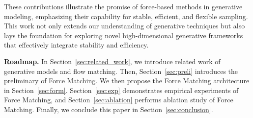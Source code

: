 These contributions illustrate the promise of force-based methods in generative modeling, emphasizing their capability for stable, efficient, and flexible sampling. This work not only extends our understanding of generative techniques but also lays the foundation for exploring novel high-dimensional generative frameworks that effectively integrate stability and efficiency.


{\bf Roadmap.} In Section~\ref{sec:related_work}, we introduce related work of generative models and flow matching. Then, Section~\ref{sec:preli} introduces the preliminary of Force Matching. We then propose the Force Matching architecture in Section~\ref{sec:form}. Section~\ref{sec:exp} demonstrates empirical experiments of Force Matching, and Section~\ref{sec:ablation} performs ablation study of Force Matching. Finally, we conclude this paper in Section~\ref{sec:conclusion}.
